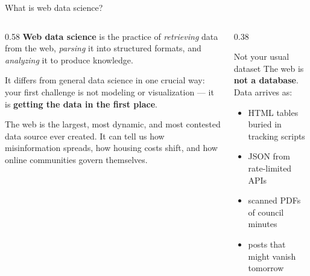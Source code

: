 \documentclass[9pt,aspectratio=169]{beamer}
\begin{document}
\begin{frame}{What is web data science?}
    \begin{columns}[T]
        \begin{column}{0.58\textwidth}
            \textbf{Web data science} is the practice of \textit{retrieving} data from the web, \textit{parsing} it into structured formats, and \textit{analyzing} it to produce knowledge.

            \vspace{1em}

            It differs from general data science in one crucial way: your first challenge is not modeling or visualization --- it is \textbf{getting the data in the first place}.

            \vspace{1em}

            The web is the largest, most dynamic, and most contested data source ever created. It can tell us how misinformation spreads, how housing costs shift, and how online communities govern themselves.
        \end{column}
        \begin{column}{0.38\textwidth}
            \begin{block}{Not your usual dataset}
                \footnotesize The web is \textbf{not a database}. Data arrives as:
                \begin{itemize}\footnotesize
                    \item HTML tables buried in tracking scripts
                    \item JSON from rate-limited APIs
                    \item scanned PDFs of council minutes
                    \item posts that might vanish tomorrow
                \end{itemize}
            \end{block}
        \end{column}
    \end{columns}
\end{frame}
\end{document}
